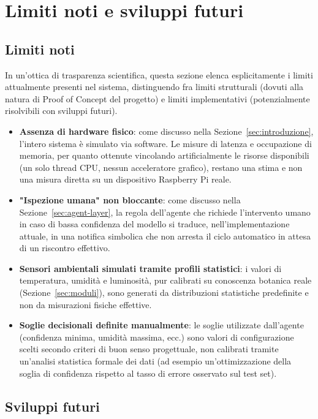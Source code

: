 \section{Limiti noti e sviluppi futuri}
\label{sec:limiti}

\subsection{Limiti noti}

In un'ottica di trasparenza scientifica, questa sezione elenca esplicitamente
i limiti attualmente presenti nel sistema, distinguendo fra limiti
strutturali (dovuti alla natura di Proof of Concept del progetto) e limiti
implementativi (potenzialmente risolvibili con sviluppi futuri).

\begin{itemize}
    \item \textbf{Assenza di hardware fisico}: come discusso nella
    Sezione~\ref{sec:introduzione}, l'intero sistema è simulato via
    software. Le misure di latenza e occupazione di memoria, per quanto
    ottenute vincolando artificialmente le risorse disponibili (un solo
    thread CPU, nessun acceleratore grafico), restano una stima e non una
    misura diretta su un dispositivo Raspberry Pi reale.
    \item \textbf{"Ispezione umana" non bloccante}: come discusso nella
    Sezione~\ref{sec:agent-layer}, la regola dell'agente che richiede
    l'intervento umano in caso di bassa confidenza del modello si traduce,
    nell'implementazione attuale, in una notifica simbolica che non arresta
    il ciclo automatico in attesa di un riscontro effettivo.
    \item \textbf{Sensori ambientali simulati tramite profili statistici}: i
    valori di temperatura, umidità e luminosità, pur calibrati su
    conoscenza botanica reale (Sezione~\ref{sec:moduli}), sono generati da
    distribuzioni statistiche predefinite e non da misurazioni fisiche
    effettive.
    \item \textbf{Soglie decisionali definite manualmente}: le soglie
    utilizzate dall'agente (confidenza minima, umidità massima, ecc.) sono
    valori di configurazione scelti secondo criteri di buon senso
    progettuale, non calibrati tramite un'analisi statistica formale dei
    dati (ad esempio un'ottimizzazione della soglia di confidenza rispetto
    al tasso di errore osservato sul test set).
\end{itemize}

\subsection{Sviluppi futuri}

